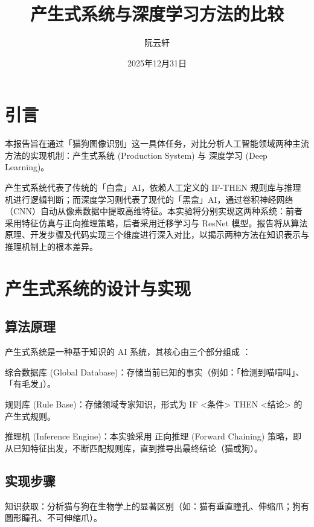 \documentclass[supercite]{Experimental_Report}
\title{产生式系统与深度学习方法的比较}
\author{阮云轩}
\date{2025年12月31日}
\theoremstyle{definition}
\begin{document}
	
	\maketitle
	
	\clearpage
	
	
	\tableofcontents[level=2]
	
	\clearpage
	
	
	\listoflistings
	
	\section{引言}
	本报告旨在通过「猫狗图像识别」这一具体任务，对比分析人工智能领域两种主流方法的实现机制：产生式系统 (Production System) 与 深度学习 (Deep Learning)。
	
	产生式系统代表了传统的「白盒」AI，依赖人工定义的 IF-THEN 规则库与推理机进行逻辑判断；而深度学习则代表了现代的「黑盒」AI，通过卷积神经网络（CNN）自动从像素数据中提取高维特征。本实验将分别实现这两种系统：前者采用特征仿真与正向推理策略，后者采用迁移学习与 ResNet 模型。报告将从算法原理、开发步骤及代码实现三个维度进行深入对比，以揭示两种方法在知识表示与推理机制上的根本差异。
	
	\section{产生式系统的设计与实现}
	\subsection{算法原理}
	产生式系统是一种基于知识的 AI 系统，其核心由三个部分组成 ：
	
	综合数据库 (Global Database)：存储当前已知的事实（例如：「检测到喵喵叫」、「有毛发」）。
	
	规则库 (Rule Base)：存储领域专家知识，形式为 IF <条件> THEN <结论> 的产生式规则。
	
	推理机 (Inference Engine)：本实验采用 正向推理 (Forward Chaining) 策略，即从已知特征出发，不断匹配规则库，直到推导出最终结论（猫或狗）。
	
	\subsection{实现步骤}
	知识获取：分析猫与狗在生物学上的显著区别（如：猫有垂直瞳孔、伸缩爪；狗有圆形瞳孔、不可伸缩爪）。
	
\end{document}
